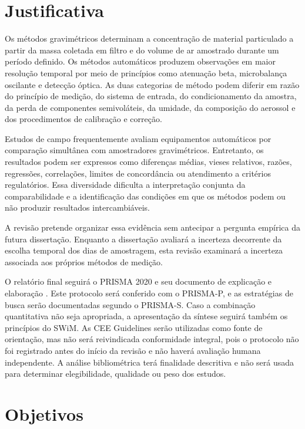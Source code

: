 \documentclass[11pt,a4paper]{article}
\begin{document}
\section{Justificativa}

Os métodos gravimétricos determinam a concentração de material particulado a partir
da massa coletada em filtro e do volume de ar amostrado durante um período definido.
Os métodos automáticos produzem observações em maior resolução temporal por meio de
princípios como atenuação beta, microbalança oscilante e detecção óptica. As duas
categorias de método podem diferir em razão do princípio de medição, do sistema de
entrada, do condicionamento da amostra, da perda de componentes semivoláteis, da
umidade, da composição do aerossol e dos procedimentos de calibração e correção.

Estudos de campo frequentemente avaliam equipamentos automáticos por comparação
simultânea com amostradores gravimétricos. Entretanto, os resultados podem ser
expressos como diferenças médias, vieses relativos, razões, regressões, correlações,
limites de concordância ou atendimento a critérios regulatórios. Essa diversidade
dificulta a interpretação conjunta da comparabilidade e a identificação das condições
em que os métodos podem ou não produzir resultados intercambiáveis.

A revisão pretende organizar essa evidência sem antecipar a pergunta empírica da
futura dissertação. Enquanto a dissertação avaliará a incerteza decorrente da escolha
temporal dos dias de amostragem, esta revisão examinará a incerteza associada aos
próprios métodos de medição.

O relatório final seguirá o PRISMA 2020 e seu documento de explicação e elaboração
\parencite{page_prisma_statement_2021,page_prisma_explanation_2021}. Este protocolo
será conferido com o PRISMA-P, e as estratégias de busca serão documentadas segundo
o PRISMA-S. Caso a combinação quantitativa não seja apropriada, a apresentação da
síntese seguirá também os princípios do SWiM. As CEE Guidelines serão utilizadas como
fonte de orientação, mas não será reivindicada conformidade integral, pois o protocolo
não foi registrado antes do início da revisão e não haverá avaliação humana
independente. A análise bibliométrica terá finalidade descritiva e não será usada para
determinar elegibilidade, qualidade ou peso dos estudos.

\section{Objetivos}
\end{document}
